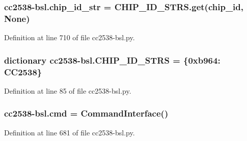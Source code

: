 \subsubsection[{\texorpdfstring{chip\+\_\+id\+\_\+str}{chip_id_str}}]{\setlength{\rightskip}{0pt plus 5cm}cc2538-\/bsl.\+chip\+\_\+id\+\_\+str = C\+H\+I\+P\+\_\+\+I\+D\+\_\+\+S\+T\+R\+S.\+get({\bf chip\+\_\+id}, None)}\hypertarget{namespacecc2538-bsl_a5bfa5af984735320cff6f78c76c4df5d}{}\label{namespacecc2538-bsl_a5bfa5af984735320cff6f78c76c4df5d}


Definition at line 710 of file cc2538-\/bsl.\+py.

\subsubsection[{\texorpdfstring{C\+H\+I\+P\+\_\+\+I\+D\+\_\+\+S\+T\+RS}{CHIP_ID_STRS}}]{\setlength{\rightskip}{0pt plus 5cm}dictionary cc2538-\/bsl.\+C\+H\+I\+P\+\_\+\+I\+D\+\_\+\+S\+T\+RS = \{0xb964\+: \textquotesingle{}\+C\+C2538\textquotesingle{}\}}\hypertarget{namespacecc2538-bsl_a270540d5e74ff733d9fd51a85d5483da}{}\label{namespacecc2538-bsl_a270540d5e74ff733d9fd51a85d5483da}


Definition at line 85 of file cc2538-\/bsl.\+py.

\subsubsection[{\texorpdfstring{cmd}{cmd}}]{\setlength{\rightskip}{0pt plus 5cm}cc2538-\/bsl.\+cmd = {\bf Command\+Interface}()}\hypertarget{namespacecc2538-bsl_a1bfa087651c4e938ac35ad3210e5e7bf}{}\label{namespacecc2538-bsl_a1bfa087651c4e938ac35ad3210e5e7bf}


Definition at line 681 of file cc2538-\/bsl.\+py.


